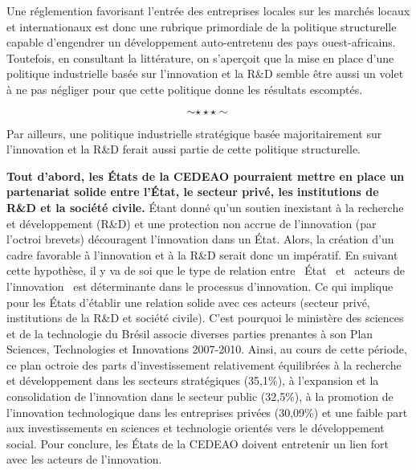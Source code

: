 	\hspace*{0.5cm}Une réglemention favorisant l'entrée des entreprises locales sur les marchés locaux et internationaux est donc une rubrique primordiale de la politique structurelle capable d'engendrer un développement auto-entretenu des pays ouest-africains. Toutefois, en consultant la littérature, on s'aperçoit que la mise en place d'une politique industrielle basée sur l'innovation et la R\&D semble être aussi un volet à ne pas négliger pour que cette politique donne les résultats escomptés.
	
	$$\sim\star\star\star\sim$$
	
	\hspace*{0.5cm}Par ailleurs, une politique industrielle stratégique basée majoritairement sur l'innovation et la R\&D ferait aussi partie de cette politique structurelle.
	
	\hspace*{0.5cm}\textbf{Tout d'abord, les \'Etats de la CEDEAO pourraient mettre en place un partenariat solide entre l'État, le secteur privé, les institutions de R\&D et la société civile.} \'Etant donné qu'un soutien inexistant à la recherche et développement (R\&D) et une protection non accrue de l'innovation (par l'octroi brevets) découragent l'innovation dans un \'Etat. Alors, la création d'un cadre favorable à l'innovation et à la R\&D serait donc un impératif. En suivant cette hypothèse, il y va de soi que le type de relation entre \guillemetleft\ \'Etat \guillemetright\ et \guillemetleft\ acteurs de l'innovation \guillemetright\ est déterminante dans le processus d'innovation. Ce qui implique pour les \'Etats d'établir une relation solide avec ces acteurs (secteur privé, institutions de la R\&D et société civile). C'est pourquoi le ministère des sciences et de la technologie du Brésil associe diverses parties prenantes à son Plan Sciences, Technologies et Innovations 2007-2010. Ainsi, au cours de cette période, ce plan octroie des parts d'investissement relativement équilibrées à la recherche et développement dans les secteurs stratégiques (35,1\%), à l'expansion et la consolidation de l'innovation dans le secteur public (32,5\%), à la promotion de l'innovation technologique dans les entreprises privées (30,09\%) et une faible part aux investissements en sciences et technologie orientés vers le développement social. Pour conclure, les \'Etats de la CEDEAO doivent entretenir un lien fort avec les acteurs de l'innovation.
	
